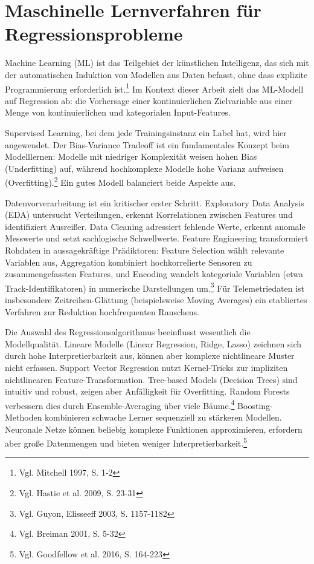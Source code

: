 \section{Maschinelle Lernverfahren für Regressionsprobleme}

Machine Learning (ML) ist das Teilgebiet der künstlichen Intelligenz, das sich mit der automatischen Induktion von Modellen aus Daten befasst, ohne dass explizite Programmierung erforderlich ist.\footnote{Vgl. Mitchell 1997, S. 1-2} Im Kontext dieser Arbeit zielt das ML-Modell auf Regression ab: die Vorhersage einer kontinuierlichen Zielvariable aus einer Menge von kontinuierlichen und kategorialen Input-Features.

Supervised Learning, bei dem jede Trainingsinstanz ein Label hat, wird hier angewendet. Der Bias-Variance Tradeoff ist ein fundamentales Konzept beim Modelllernen: Modelle mit niedriger Komplexität weisen hohen Bias (Underfitting) auf, während hochkomplexe Modelle hohe Varianz aufweisen (Overfitting).\footnote{Vgl. Hastie et al. 2009, S. 23-31} Ein gutes Modell balanciert beide Aspekte aus.

Datenvorverarbeitung ist ein kritischer erster Schritt. Exploratory Data Analysis (EDA) untersucht Verteilungen, erkennt Korrelationen zwischen Features und identifiziert Ausreißer. Data Cleaning adressiert fehlende Werte, erkennt anomale Messwerte und setzt sachlogische Schwellwerte. Feature Engineering transformiert Rohdaten in aussagekräftige Prädiktoren: Feature Selection wählt relevante Variablen aus, Aggregation kombiniert hochkorrelierte Sensoren zu zusammengefassten Features, und Encoding wandelt kategoriale Variablen (etwa Track-Identifikatoren) in numerische Darstellungen um.\footnote{Vgl. Guyon, Elisseeff 2003, S. 1157-1182} Für Telemetriedaten ist insbesondere Zeitreihen-Glättung (beispielsweise Moving Averages) ein etabliertes Verfahren zur Reduktion hochfrequenten Rauschens.

Die Auswahl des Regressionsalgorithmus beeinflusst wesentlich die Modellqualität. Lineare Modelle (Linear Regression, Ridge, Lasso) zeichnen sich durch hohe Interpretierbarkeit aus, können aber komplexe nichtlineare Muster nicht erfassen. Support Vector Regression nutzt Kernel-Tricks zur impliziten nichtlinearen Feature-Transformation. Tree-based Models (Decision Trees) sind intuitiv und robust, zeigen aber Anfälligkeit für Overfitting. Random Forests verbessern dies durch Ensemble-Averaging über viele Bäume.\footnote{Vgl. Breiman 2001, S. 5-32} Boosting-Methoden kombinieren schwache Lerner sequenziell zu stärkeren Modellen. Neuronale Netze können beliebig komplexe Funktionen approximieren, erfordern aber große Datenmengen und bieten weniger Interpretierbarkeit.\footnote{Vgl. Goodfellow et al. 2016, S. 164-223}

